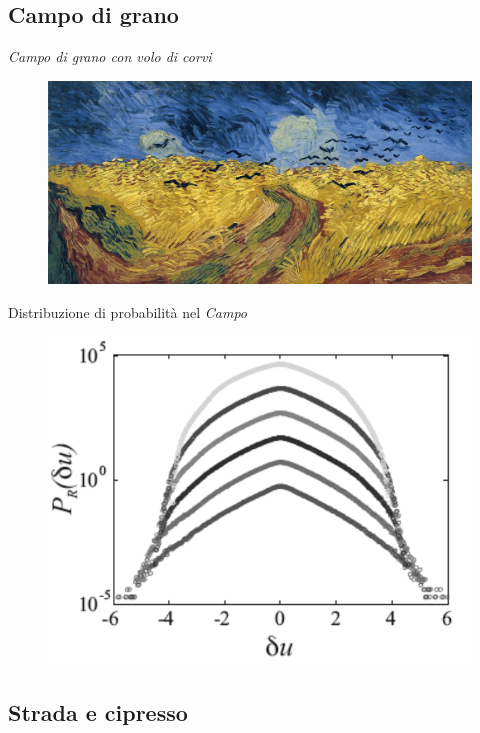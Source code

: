 \documentclass[11pt]{beamer}
\begin{document}
\subsection{Campo di grano}

\begin{frame}{\emph{Campo di grano con volo di corvi}}
\begin{figure}
\centering
\includegraphics[scale=0.1]{wheatfield.jpg}
\end{figure}
\end{frame}

\begin{frame}{Distribuzione di probabilità nel \emph{Campo}}
\begin{figure}
\centering
\includegraphics[scale=0.4]{PDF_wheat.png}
\end{figure}
\end{frame}

\subsection{Strada e cipresso}
\end{document}
